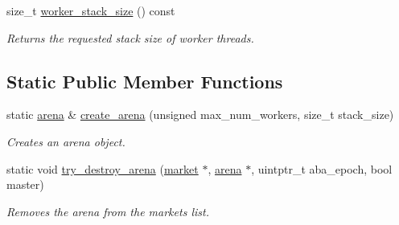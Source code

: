 \begin{DoxyCompactItemize}
\item 
\hypertarget{classtbb_1_1internal_1_1market_ac6ecbe31da77180a3ce42b7b3c46fc18}{}size\+\_\+t \hyperlink{classtbb_1_1internal_1_1market_ac6ecbe31da77180a3ce42b7b3c46fc18}{worker\+\_\+stack\+\_\+size} () const \label{classtbb_1_1internal_1_1market_ac6ecbe31da77180a3ce42b7b3c46fc18}

\begin{DoxyCompactList}\small\item\em Returns the requested stack size of worker threads. \end{DoxyCompactList}\end{DoxyCompactItemize}
\subsection*{Static Public Member Functions}
\begin{DoxyCompactItemize}
\item 
static \hyperlink{classtbb_1_1internal_1_1arena}{arena} \& \hyperlink{classtbb_1_1internal_1_1market_a6f38ae94063d6847be752149048413bf}{create\+\_\+arena} (unsigned max\+\_\+num\+\_\+workers, size\+\_\+t stack\+\_\+size)
\begin{DoxyCompactList}\small\item\em Creates an arena object. \end{DoxyCompactList}\item 
\hypertarget{classtbb_1_1internal_1_1market_a1f3159224e16ec28926b57fe17889907}{}static void \hyperlink{classtbb_1_1internal_1_1market_a1f3159224e16ec28926b57fe17889907}{try\+\_\+destroy\+\_\+arena} (\hyperlink{classtbb_1_1internal_1_1market}{market} $\ast$, \hyperlink{classtbb_1_1internal_1_1arena}{arena} $\ast$, uintptr\+\_\+t aba\+\_\+epoch, bool master)\label{classtbb_1_1internal_1_1market_a1f3159224e16ec28926b57fe17889907}

\begin{DoxyCompactList}\small\item\em Removes the arena from the market\textquotesingle{}s list. \end{DoxyCompactList}\end{DoxyCompactItemize}
